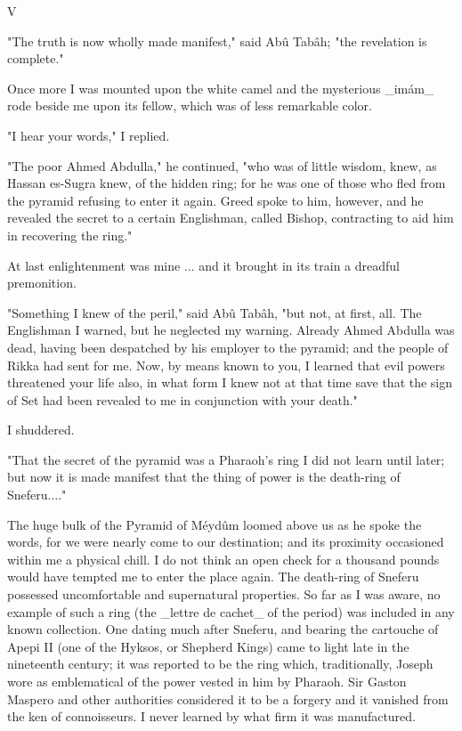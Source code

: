 V

"The truth is now wholly made manifest," said Abû Tabâh; "the
revelation is complete."

Once more I was mounted upon the white camel and the mysterious _imám_
rode beside me upon its fellow, which was of less remarkable color.

"I hear your words," I replied.

"The poor Ahmed Abdulla," he continued, "who was of little wisdom,
knew, as Hassan es-Sugra knew, of the hidden ring; for he was one of
those who fled from the pyramid refusing to enter it again. Greed
spoke to him, however, and he revealed the secret to a certain
Englishman, called Bishop, contracting to aid him in recovering the
ring."

At last enlightenment was mine ... and it brought in its train a
dreadful premonition.

"Something I knew of the peril," said Abû Tabâh, "but not, at first,
all. The Englishman I warned, but he neglected my warning. Already
Ahmed Abdulla was dead, having been despatched by his employer to the
pyramid; and the people of Rikka had sent for me. Now, by means known
to you, I learned that evil powers threatened your life also, in what
form I knew not at that time save that the sign of Set had been
revealed to me in conjunction with your death."

I shuddered.

"That the secret of the pyramid was a Pharaoh's ring I did not learn
until later; but now it is made manifest that the thing of power is
the death-ring of Sneferu...."

The huge bulk of the Pyramid of Méydûm loomed above us as he spoke the
words, for we were nearly come to our destination; and its proximity
occasioned within me a physical chill. I do not think an open check
for a thousand pounds would have tempted me to enter the place again.
The death-ring of Sneferu possessed uncomfortable and supernatural
properties. So far as I was aware, no example of such a ring (the
_lettre de cachet_ of the period) was included in any known collection.
One dating much after Sneferu, and bearing the cartouche of Apepi II
(one of the Hyksos, or Shepherd Kings) came to light late in the
nineteenth century; it was reported to be the ring which, traditionally,
Joseph wore as emblematical of the power vested in him by Pharaoh.
Sir Gaston Maspero and other authorities considered it to be a forgery
and it vanished from the ken of connoisseurs. I never learned by what
firm it was manufactured.

